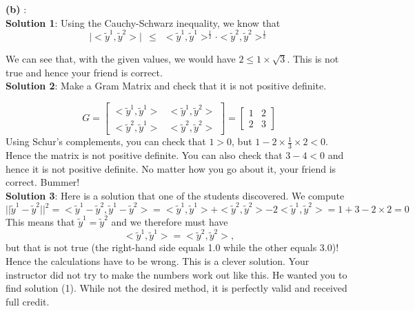 \documentclass[letterpaper]{article}
\begin{document}
\textbf{(b)} : \\

	
 \textbf{Solution 1}: Using the Cauchy-Schwarz inequality, we know that
 $$ \vert < \tilde y^1 , \tilde y^2 > \vert ~~\leq~~ < \tilde y^1, \tilde y^1 >^{\frac{1}{2}} \cdot < \tilde y^2 , \tilde y^2 >^{\frac{1}{2}}$$

We can see that, with the given values, we would have $2 \leq 1 \times \sqrt{3}$. This is not true and hence your friend is correct.	\\

\textbf{Solution 2}: Make a Gram Matrix and check that it is not positive definite.

$$ G = \begin{bmatrix}<\tilde y^1, \tilde y^1> & <\tilde y^1,\tilde y^2> \\ <\tilde y^2,\tilde y^1> & <\tilde y^2, \tilde y^2>\end{bmatrix} = \begin{bmatrix} 1 & 2 \\ 2 & 3 \end{bmatrix} $$
Using Schur's complements, you can check that $1 > 0$, but $1-2 \times \frac{1}{3} \times 2 < 0$. Hence the matrix is not positive definite. You can also check that $3-4<0$ and hence it is not positive definite. No matter how you go about it, your friend is correct. Bummer! \\

\textbf{Solution 3}: Here is a solution that one of the students discovered. We compute 
$$ ||\tilde y^1 - \tilde y^2 ||^2 = <\tilde y^1 - \tilde y^2, \tilde y^1 - \tilde y^2> = <\tilde y^1 , \tilde y^1> + <\tilde y^2 , \tilde y^2> -2 <\tilde y^1 , \tilde y^2>=1+ 3 - 2\times 2=0$$
This means that $\tilde y^1 = \tilde y^2$ and we therefore must have
$$<\tilde y^1 , \tilde y^1> = <\tilde y^2 , \tilde y^2> , $$
but that is not true (the right-hand side equals 1.0 while the other equals 3.0)! Hence the calculations have to be wrong. This is a clever solution. Your instructor did not try to make the numbers work out like this. He wanted you to find solution (1). While not the desired method, it is perfectly valid and received full credit. \\


\end{document}
